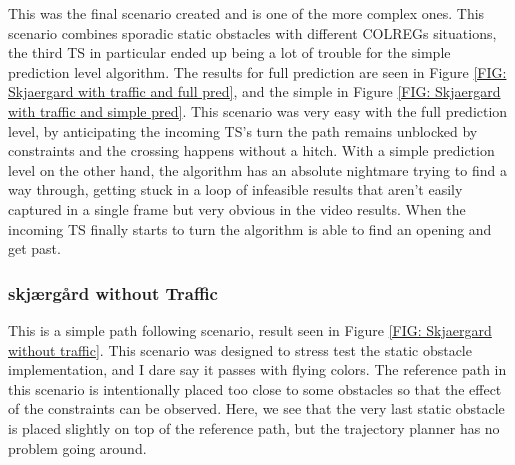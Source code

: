 This was the final scenario created and is one of the more complex ones. This scenario combines sporadic static obstacles with different COLREGs situations, the third
TS in particular ended up being a lot of trouble for the simple prediction level algorithm. The results for full prediction are seen in Figure \ref{FIG: Skjaergard with traffic and full pred},
and the simple in Figure \ref{FIG: Skjaergard with traffic and simple pred}. This scenario was very easy with the full prediction level, by anticipating the incoming TS's turn the path
remains unblocked by constraints and the crossing happens without a hitch. With a simple prediction level on the other hand, the algorithm has an absolute nightmare trying to find a way through,
getting stuck in a loop of infeasible results that aren't easily captured in a single frame but very obvious in the video results. When the incoming TS finally starts to turn the algorithm
is able to find an opening and get past.


\subsubsection{skjærgård without Traffic}
This is a simple path following scenario, result seen in Figure \ref{FIG: Skjaergard without traffic}. This scenario was designed to stress
test the static obstacle implementation, and I dare say it passes with flying colors. The reference path in this scenario is intentionally placed
too close to some obstacles so that the effect of the constraints can be observed. Here, we see that the very last static obstacle is placed
slightly on top of the reference path, but the trajectory planner has no problem going around.

